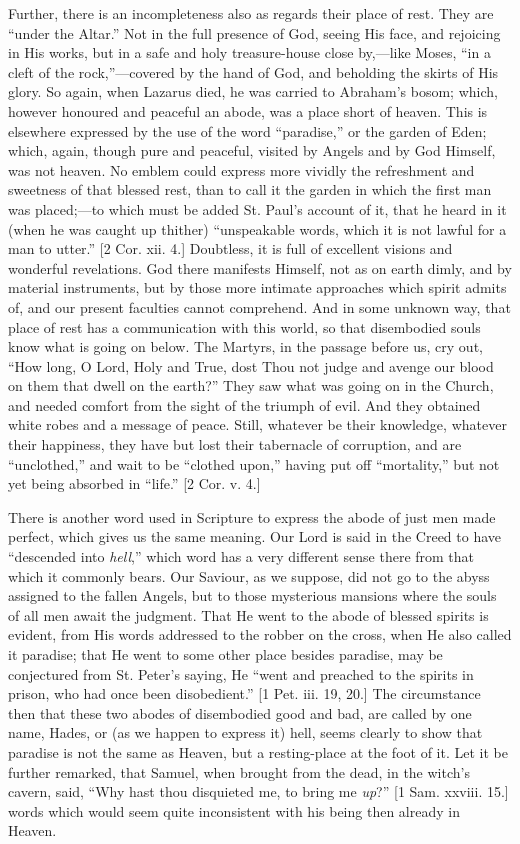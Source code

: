 Further, there is an incompleteness also as regards their place of
rest. They are ``under the Altar.'' Not in the full presence
of God, seeing His face, and rejoicing in His works, but in a safe and
holy treasure-house close by,—like Moses, ``in a cleft of the
rock,''—covered by the hand of God, and beholding the skirts of
His glory. So again, when Lazarus died, he was carried to Abraham's
bosom; which, however honoured and peaceful an abode, was a place
short of heaven. This is elsewhere expressed by the use of the word
``paradise,'' or the garden of Eden; which, again, though pure
and peaceful, visited by Angels and by God Himself, was not heaven. No
emblem could express more vividly the refreshment and sweetness of
that blessed rest, than to call it the garden in which the first man
was placed;—to which must be added St. Paul's account of it, that he
heard in it (when he was caught up thither) ``unspeakable words,
which it is not lawful for a man to utter.'' [2 Cor. xii. 4.]
Doubtless, it is full of excellent visions and wonderful revelations.
God there manifests Himself, not as on earth dimly, and by material
instruments, but by those more intimate approaches which spirit admits
of, and our present faculties cannot comprehend. And in some unknown
way, that place of rest has a communication with this world, so that
disembodied souls know what is going on below. The Martyrs, in the
passage before us, cry out, ``How long, O Lord, Holy and True,
dost Thou not judge and avenge our blood on them that dwell on the
earth?'' They saw what was going on in the Church, and needed
comfort from the sight of the triumph of evil. And they obtained white
robes and a message of peace. Still, whatever be their knowledge,
whatever their happiness, they have but lost their tabernacle of
corruption, and are ``unclothed,'' and wait to be
``clothed upon,'' having put off ``mortality,'' but
not yet being absorbed in ``life.'' [2 Cor. v. 4.]

There is another word used in Scripture to express the abode of
just men made perfect, which gives us the same meaning. Our Lord is
said in the Creed to have ``descended into \emph{hell},''
which word has a very different sense there from that which it
commonly bears. Our Saviour, as we suppose, did not go to the abyss
assigned to the fallen Angels, but to those mysterious mansions where
the souls of all men await the judgment. That He went to the abode of
blessed spirits is evident, from His words addressed to the robber on
the cross, when He also called it paradise; that He went to some other
place besides paradise, may be conjectured from St. Peter's saying, He
``went and preached to the spirits in prison, who had once been
disobedient.'' [1 Pet. iii. 19, 20.] The circumstance then that
these two abodes of disembodied good and bad, are called by one name,
Hades, or (as we happen to express it) hell, seems clearly to show
that paradise is not the same as Heaven, but a resting-place at the
foot of it. Let it be further remarked, that Samuel, when brought from
the dead, in the witch's cavern, said, ``Why hast thou disquieted
me, to bring me \emph{up}?'' [1 Sam. xxviii. 15.] words which
would seem quite inconsistent with his being then already in Heaven.

